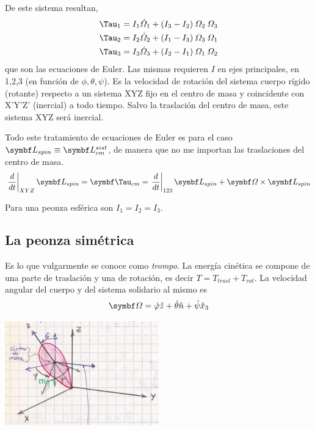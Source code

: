 \documentclass[10pt,oneside]{CBFT_book}
\begin{document}
De este sistema resultan,
\begin{align*}
\Tau_1 = I_1 \dot{\Omega}_1 + (I_3-I_2) \: \Omega_2 \: \Omega_3 \\
\Tau_2 = I_2 \dot{\Omega}_2 + (I_1-I_3) \: \Omega_3 \: \Omega_1 \\
\Tau_3 = I_3 \dot{\Omega}_3 + (I_2-I_1) \: \Omega_1 \: \Omega_2
\end{align*}
que son las ecuaciones de Euler. 
Las mismas requieren $I$ en ejes principales, \vb{\Omega} en 1,2,3 (en función de $\phi,\theta,\psi$).
Es \vb{\Omega} la velocidad de rotación del sistema cuerpo rígido (rotante) respecto a un sistema XYZ
fijo en el centro de masa y coincidente con X'Y'Z' (inercial) a todo tiempo. Salvo la traslación del centro
de masa, este sistema XYZ será inercial.

Todo este tratamiento de ecuaciones de Euler es para el caso $\vb{L}_{spin} \equiv \vb{L}_{cm}^{sist}$, de
manera que no me importan las traslaciones del centro de masa.
\[
	\left.\frac{d}{dt}\right|_{XYZ} \vb{L}_{spin} = \vb{\Tau}_{cm} =
	\left.\frac{d}{dt}\right|_{123} \vb{L}_{spin} + \vb{\Omega} \times \vb{L}_{spin} 
\]

Para una peonza esférica son $I_1=I_2=I_3$.

\subsection{La peonza simétrica}

Es lo que vulgarmente se conoce como {\it trompo}.
La energía cinética se compone de una parte de traslación y una de rotación, es decir $T=T_{trasl} + T_{rot}$.
La velocidad angular del cuerpo y del sistema solidario al mismo es
\[
	\vb{\Omega} = \dot{\varphi} \hat{z} + \dot{\theta} \hat{n} + \dot{\psi} \hat{x}_3
\]

\includegraphics[width=0.5\textwidth]{images/fig_mc_peonza_segunda_1.jpg}
\end{document}
